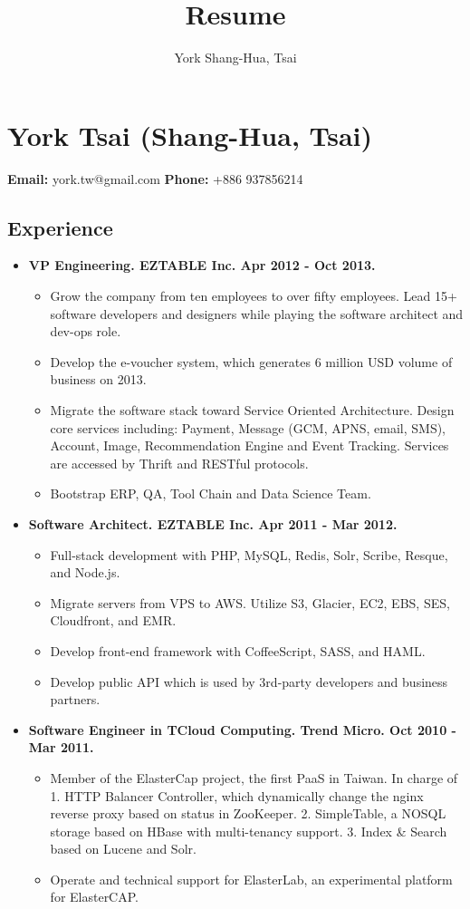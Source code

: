 \documentclass[10pt]{article}
\title{Resume}
\author{York Shang-Hua, Tsai}
\date{}
\begin{document}
\section*{York Tsai (Shang-Hua, Tsai)}
\textbf{Email:} york.tw@gmail.com
\textbf{Phone:} +886 937856214

\subsection*{Experience}
\begin{itemize}
\item \textbf{VP Engineering. EZTABLE Inc. Apr 2012 - Oct 2013.}
\begin{itemize}
\item Grow the company from ten employees to over fifty employees. Lead 15+ software developers and designers while playing the software architect and dev-ops role.
\item Develop the e-voucher system, which generates 6 million USD volume of business on 2013.
\item Migrate the software stack toward Service Oriented Architecture. Design core services including: Payment, Message (GCM, APNS, email, SMS), Account, Image, Recommendation Engine and Event Tracking. Services are accessed by Thrift and RESTful protocols.
\item Bootstrap ERP, QA, Tool Chain and Data Science Team.
\end{itemize}

\item \textbf{Software Architect. EZTABLE Inc. Apr 2011 - Mar 2012.}
\begin{itemize}
\item Full-stack development with PHP, MySQL, Redis, Solr, Scribe, Resque, and Node.js.
\item Migrate servers from VPS to AWS. Utilize S3, Glacier, EC2, EBS, SES, Cloudfront, and EMR.
\item Develop front-end framework with CoffeeScript, SASS, and HAML.
\item Develop public API which is used by 3rd-party developers and business partners.
\end{itemize}

\item \textbf{Software Engineer in TCloud Computing. Trend Micro. Oct 2010 - Mar 2011.}
\begin{itemize}
\item Member of the ElasterCap project, the first PaaS in Taiwan. In charge of 1. HTTP Balancer Controller, which dynamically change the nginx reverse proxy based on status in ZooKeeper. 2. SimpleTable, a NOSQL storage based on HBase with multi-tenancy support. 3. Index \& Search based on Lucene and Solr.
\item Operate and technical support for ElasterLab, an experimental platform for ElasterCAP.
\end{itemize}


\end{itemize}
\end{document}
